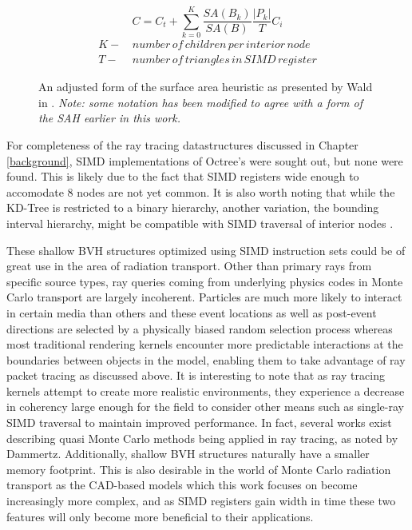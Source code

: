 \documentclass[12pt, a4paper]{article}
\begin{document}
\begin{figure}[H]
  \begin{equation}
    C = C_t + \sum_{k=0}^{K} \frac{SA(B_k)}{SA(B)}\frac{|P_k|}{T}C_i
  \end{equation}
  \begin{align*}
    K - & \, number \, of \, children \, per \, interior \, node \\
    T - & \, number \, of \, triangles \, in \, SIMD \, register
  \end{align*}
  \caption{An adjusted form of the surface area heuristic as presented by Wald in \cite{Wald_2008}. \textit{Note: some notation has been modified to agree with a form of the SAH earlier in this work.}}
  \label{adjusted_SAH}
\end{figure}

For completeness of the ray tracing datastructures discussed in Chapter \ref{background}, SIMD implementations of Octree's were sought out, but none were found. This is likely due to the fact that SIMD registers wide enough to accomodate 8 nodes are not yet common. It is also worth noting that while the KD-Tree is restricted to a binary hierarchy, another variation, the bounding interval hierarchy, might be compatible with SIMD traversal of interior nodes \cite{Watcher_2006}. 

These shallow BVH structures optimized using SIMD instruction sets could be of great use in the area of radiation transport. Other than primary rays from specific source types, ray queries coming from underlying physics codes in Monte Carlo transport are largely incoherent. Particles are much more likely to interact in certain media than others and these event locations as well as post-event directions are selected by a physically biased random selection process whereas most traditional rendering kernels encounter more predictable interactions at the boundaries between objects in the model, enabling them to take advantage of ray packet tracing as discussed above. It is interesting to note that as ray tracing kernels attempt to create more realistic environments, they experience a decrease in coherency large enough for the field to consider other means such as single-ray SIMD traversal to maintain improved performance. In fact, several works exist describing quasi Monte Carlo methods being applied in ray tracing, as noted by Dammertz\cite{Dammertz_2008}. Additionally, shallow BVH structures naturally have a smaller memory footprint. This is also desirable in the world of Monte Carlo radiation transport as the CAD-based models which this work focuses on become increasingly more complex, and as SIMD registers gain width in time these two features will only become more beneficial to their applications.
\end{document}

